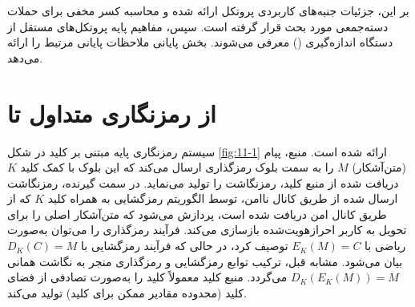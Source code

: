 بر این، جزئیات جنبه‌های کاربردی پروتکل  ارائه شده و محاسبه کسر مخفی برای حملات دسته‌جمعی مورد بحث قرار گرفته است. سپس، مفاهیم پایه پروتکل‌های  مستقل از دستگاه اندازه‌گیری () معرفی می‌شوند. بخش پایانی ملاحظات پایانی مرتبط را ارائه می‌دهد.






\section{از رمزنگاری متداول تا }
\label{sec:7-1}

سیستم رمزنگاری پایه مبتنی بر کلید در شکل \ref{fig:11-1} ارائه شده است. منبع، پیام (متن‌آشکار) $M$ را به سمت بلوک رمزگذاری ارسال می‌کند که این بلوک با کمک کلید $K$ دریافت شده از منبع کلید، رمزنگاشت را تولید می‌نماید. در سمت گیرنده، رمزنگاشت ارسال شده از طریق کانال ناامن، توسط الگوریتم رمزگشایی به همراه کلید $K$ که از طریق کانال امن دریافت شده است، پردازش می‌شود که متن‌آشکار اصلی را برای تحویل به کاربر احرازهویت‌شده بازسازی می‌کند. فرآیند رمزگذاری را می‌توان به‌صورت ریاضی با $E_K(M) = C$ توصیف کرد، در حالی که فرآیند رمزگشایی با $D_K(C) = M$ بیان می‌شود. مشابه قبل، ترکیب توابع رمزگشایی و رمزگذاری منجر به نگاشت همانی $D_K(E_K(M)) = M$ می‌گردد. منبع کلید معمولاً کلید را به‌صورت تصادفی از فضای کلید (محدوده مقادیر ممکن برای کلید) تولید می‌کند.

